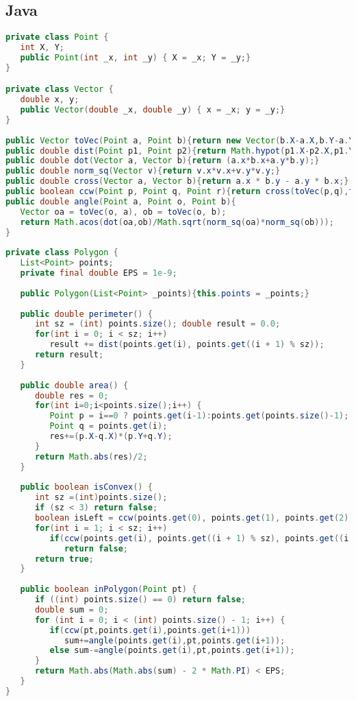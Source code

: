 \subsection{Java}
\begin{lstlisting}[language=Java]
private class Point {
   int X, Y;
   public Point(int _x, int _y) { X = _x; Y = _y;}
}

private class Vector {
   double x, y;
   public Vector(double _x, double _y) { x = _x; y = _y;}
}
	
public Vector toVec(Point a, Point b){return new Vector(b.X-a.X,b.Y-a.Y);}
public double dist(Point p1, Point p2){return Math.hypot(p1.X-p2.X,p1.Y-p2.Y);}
public double dot(Vector a, Vector b){return (a.x*b.x+a.y*b.y);}
public double norm_sq(Vector v){return v.x*v.x+v.y*v.y;}
public double cross(Vector a, Vector b){return a.x * b.y - a.y * b.x;}
public boolean ccw(Point p, Point q, Point r){return cross(toVec(p,q),toVec(p,r))>0;}
public double angle(Point a, Point o, Point b){
   Vector oa = toVec(o, a), ob = toVec(o, b);
   return Math.acos(dot(oa,ob)/Math.sqrt(norm_sq(oa)*norm_sq(ob)));
}
	
private class Polygon {
   List<Point> points;
   private final double EPS = 1e-9;
		
   public Polygon(List<Point> _points){this.points = _points;}
		
   public double perimeter() {
      int sz = (int) points.size(); double result = 0.0;
      for(int i = 0; i < sz; i++)
         result += dist(points.get(i), points.get((i + 1) % sz));
      return result;
   }
   
   public double area() {
      double res = 0;
      for(int i=0;i<points.size();i++) {
         Point p = i==0 ? points.get(i-1):points.get(points.size()-1);
         Point q = points.get(i);
         res+=(p.X-q.X)*(p.Y+q.Y);
      }
      return Math.abs(res)/2;
   }
		
   public boolean isConvex() {
      int sz =(int)points.size();
      if (sz < 3) return false;
      boolean isLeft = ccw(points.get(0), points.get(1), points.get(2));
      for(int i = 1; i < sz; i++)
         if(ccw(points.get(i), points.get((i + 1) % sz), points.get((i + 2) % sz)) != isLeft)
            return false;
      return true;
   }
		
   public boolean inPolygon(Point pt) {
      if ((int) points.size() == 0) return false;
	  double sum = 0;
      for (int i = 0; i < (int) points.size() - 1; i++) {
         if(ccw(pt,points.get(i),points.get(i+1)))
            sum+=angle(points.get(i),pt,points.get(i+1));
         else sum-=angle(points.get(i),pt,points.get(i+1));
      }
      return Math.abs(Math.abs(sum) - 2 * Math.PI) < EPS;
   }
}
\end{lstlisting}	